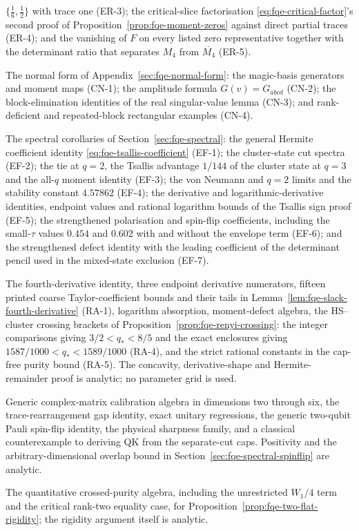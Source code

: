 \begin{description}
$\{\tfrac16,\tfrac12\}$ with trace one (ER-3); the critical-slice factorisation \eqref{eq:fqe-critical-factor}'s second proof of Proposition~\ref{prop:fqe-moment-zeros}
against direct partial traces (ER-4); and the vanishing of $F$ on every listed zero representative together
with the determinant ratio that separates $M_4$ from $\overline{M_4}$ (ER-5).
\item[CN-1--CN-4] The normal form of Appendix~\ref{sec:fqe-normal-form}: the magic-basis generators and
moment maps (CN-1); the amplitude formula $G(v)=G_{abcd}$ (CN-2); the block-elimination identities of the
real singular-value lemma (CN-3); and rank-deficient and repeated-block rectangular examples (CN-4).
\item[EF-1--EF-7] The spectral corollaries of Section~\ref{sec:fqe-spectral}: the general Hermite
coefficient identity \eqref{eq:fqe-tsallis-coefficient} (EF-1); the cluster-state cut spectra (EF-2); the
tie at $q=2$, the Tsallis advantage $1/144$ of the cluster state at $q=3$ and the all-$q$ moment identity (EF-3);
the von Neumann and $q=2$ limits and the stability constant $4.57862$ (EF-4); the derivative and
logarithmic-derivative identities, endpoint values and rational logarithm bounds of the Tsallis sign proof (EF-5);
the strengthened polarisation and spin-flip coefficients, including the small-$\tau$ values $0.454$ and $0.602$ with and without the envelope term (EF-6); and the strengthened defect identity with the
leading coefficient of the determinant pencil used in the mixed-state exclusion (EF-7).
\item[RA-1--RA-5] The fourth-derivative identity, three endpoint derivative numerators,
fifteen printed coarse Taylor-coefficient bounds and their tails in
Lemma~\ref{lem:fqe-slack-fourth-derivative} (RA-1), logarithm absorption,
moment-defect algebra, the HS--cluster crossing brackets of Proposition~\ref{prop:fqe-renyi-crossing}: the integer comparisons giving $3/2<q_*<8/5$ and the exact enclosures giving $1587/1000<q_*<1589/1000$ (RA-4), and the strict
rational constants in the cap-free purity bound (RA-5). The concavity,
derivative-shape and Hermite-remainder proof is analytic; no parameter grid
is used.
\item[SCB-1--SCB-5] Generic complex-matrix calibration algebra in dimensions
two through six, the trace-rearrangement gap identity, exact unitary
regressions, the generic two-qubit Pauli spin-flip identity, the
physical sharpness family, and a classical counterexample to deriving QK
from the separate-cut caps. Positivity and the arbitrary-dimensional
overlap bound in Section~\ref{sec:fqe-spectral-spinflip} are analytic.
\item[UR-4] The quantitative crossed-purity algebra, including the unrestricted
$W_1/4$ term and the critical rank-two equality case, for
Proposition~\ref{prop:fqe-two-flat-rigidity}; the rigidity argument itself is analytic.


\end{description}
